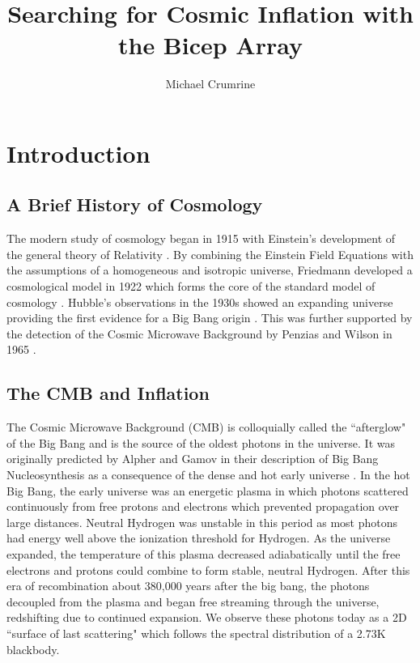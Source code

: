 \documentclass[12pt]{article}
\begin{document}
\author{Michael Crumrine}
\title{Searching for Cosmic Inflation with the Bicep Array}
\maketitle



\section{Introduction}

\subsection{A Brief History of Cosmology}
The modern study of cosmology began in 1915 with Einstein's development of the general
theory of Relativity \cite{cite:Einstein}. By combining the Einstein Field
Equations with the assumptions of a homogeneous and isotropic universe,
Friedmann developed a cosmological model in 1922 which forms the core of the standard
model of cosmology \cite{cite:Friedmann}. Hubble's observations in the 1930s
showed an expanding universe providing the first evidence
for a Big Bang origin \cite{cite:Hubble}. This was further supported by the detection of the
Cosmic Microwave Background by Penzias and Wilson in 1965 \cite{cite:Penzias}.



\subsection{The CMB and Inflation}
The Cosmic Microwave Background (CMB) is colloquially called the ``afterglow"
of the Big Bang and is the source of the oldest photons in the universe.
It was originally predicted by Alpher and Gamov in their description of Big Bang
Nucleosynthesis as a consequence of the dense and hot early
universe \cite{cite:BBN}.  In the hot Big Bang, the early universe was an
energetic plasma in which photons scattered continuously from free protons and
electrons which prevented propagation over large distances.  Neutral Hydrogen
was unstable in this period as most photons had energy well above the
ionization threshold for Hydrogen. As the universe expanded, the temperature
of this plasma decreased adiabatically until the free electrons and protons
could combine to form stable, neutral Hydrogen. After this era of
recombination about 380,000 years after the big bang, the photons decoupled
from the plasma and began free streaming through the universe, redshifting due
to continued expansion. We observe these photons today as a 2D ``surface of last
scattering" which follows the spectral distribution of a 2.73K blackbody. 
\end{document}
